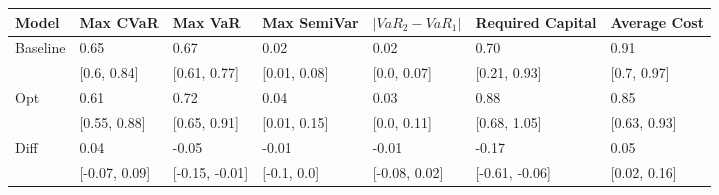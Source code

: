 \begin{tabular}{lllllll}
\toprule
   Model &      Max CVaR &        Max VaR &  Max SemiVar & $|VaR_2 - VaR_1|$ & Required Capital & Average Cost \\
\midrule
Baseline &          0.65 &           0.67 &         0.02 &              0.02 &             0.70 &         0.91 \\
         &   [0.6, 0.84] &   [0.61, 0.77] & [0.01, 0.08] &       [0.0, 0.07] &     [0.21, 0.93] &  [0.7, 0.97] \\
     Opt &          0.61 &           0.72 &         0.04 &              0.03 &             0.88 &         0.85 \\
         &  [0.55, 0.88] &   [0.65, 0.91] & [0.01, 0.15] &       [0.0, 0.11] &     [0.68, 1.05] & [0.63, 0.93] \\
    Diff &          0.04 &          -0.05 &        -0.01 &             -0.01 &            -0.17 &         0.05 \\
         & [-0.07, 0.09] & [-0.15, -0.01] &  [-0.1, 0.0] &     [-0.08, 0.02] &   [-0.61, -0.06] & [0.02, 0.16] \\
\bottomrule
\end{tabular}
